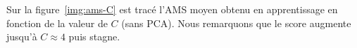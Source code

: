 \documentclass[12pt]{article}
\newcommand{\figref}[1]{figure~\ref{#1}}
\begin{document}
\begin{table}[H]
    \caption{Paramètres optimaux pour les méthodes d'ensemble (sans PCA)}
    \label{tab:ensemble-parameters}
\end{table}


Sur la \figref{img:ams-C} est tracé l'AMS moyen obtenu en apprentissage en
fonction de la valeur de $C$ (sans PCA). Nous remarquons que le score augmente
jusqu'à $C \approx 4$ puis stagne.
\end{document}
